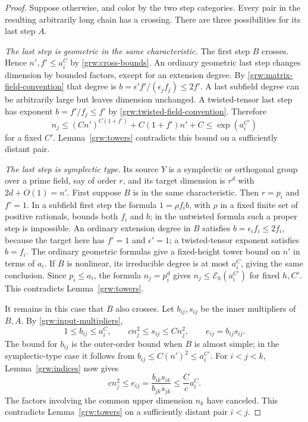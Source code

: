 \begin{proof}
Suppose otherwise, and color by the two step categories.  Every pair in
the resulting arbitrarily long chain has a crossing.  There are three
possibilities for its last step $A$.

\smallskip\noindent
\emph{The last step is geometric in the same characteristic.}
The first step $B$ crosses.  Hence $n',f'\le a_i^C$ by
\eqref{grw:cross-bounds}.  An ordinary geometric last step changes
dimension by bounded factors, except for an extension degree.  By
\eqref{grw:matrix-field-convention} that degree is
$b=\epsilon'f'/(\epsilon_jf_j)\le2f'$.  A last subfield degree can be
arbitrarily large but leaves dimension unchanged.  A twisted-tensor
last step has exponent $b=f'/f_j\le f'$ by
\eqref{grw:twisted-field-convention}.  Therefore
\[
 n_j\le (C n')^{C(1+f')}+C(1+f')n'+C
       \le\exp(a_i^{C'})
\]
for a fixed $C'$.  Lemma~\ref{grw:towers} contradicts this bound on a
sufficiently distant pair.

\smallskip\noindent
\emph{The last step is symplectic type.}
Its source $Y$ is a symplectic or orthogonal group over a prime field,
say of order $r$, and its target dimension is $r^{d}$ with
$2d+O(1)=n'$.
First suppose $B$ is in the same characteristic.  Then $r=p_i$ and
$f'=1$.  In a subfield first step the formula $1=\rho f_i b$, with
$\rho$ in a fixed finite set of positive rationals, bounds both $f_i$
and $b$; in the untwisted formula such a proper step is impossible.
An ordinary extension degree in $B$ satisfies
$b=\epsilon_i f_i\le2f_i$, because the target here has $f'=1$ and
$\epsilon'=1$; a twisted-tensor exponent satisfies $b=f_i$.
The ordinary geometric formulas give a fixed-height tower
bound on $n'$ in terms of $a_i$.  If $B$ is nonlinear, its irreducible
degree is at most $a_i^C$, giving the same conclusion.  Since
$p_i\le a_i$, the formula $n_j=p_i^{d}$ gives
$n_j\le\mathcal E_h(a_i^{C'})$ for fixed $h,C'$.  This contradicts
Lemma~\ref{grw:towers}.

It remains in this case that $B$ also crosses.  Let $b_{ij},s_{ij}$
be the inner multipliers of $B,A$.  By
\ref{grw:input-multipliers},
\[
 1\le b_{ij}\le a_i^C,
 \qquad c n_j^2\le s_{ij}\le C n_j^2,
 \qquad e_{ij}=b_{ij}s_{ij}.
\]
The bound for $b_{ij}$ is the outer-order bound when $B$ is almost
simple; in the symplectic-type case it follows from
$b_{ij}\le C(n')^2\le a_i^{C'}$.
For $i<j<k$, Lemma~\ref{grw:indices} now gives
\[
 c n_j^2\le e_{ij}
 =\frac{b_{ik}s_{ik}}{b_{jk}s_{jk}}
 \le\frac{C}{c}a_i^C.
\]
The factors involving the common upper dimension $n_k$ have canceled.
This contradicts Lemma~\ref{grw:towers} on a sufficiently distant
pair $i<j$.


\end{proof}
